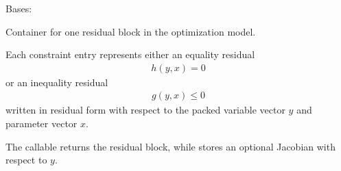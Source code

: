 \documentclass[letterpaper,10pt,english,openany,oneside]{sphinxmanual}
\begin{document}
\begin{fulllineitems}
\label{\detokenize{api/core/jaxmodel/constraints:jaxmodel.constraints.ConstraintEntry}}
\pysigstartsignatures
{}
\pysigstopsignatures
\sphinxAtStartPar
Bases: 

\sphinxAtStartPar
Container for one residual block in the optimization model.

\sphinxAtStartPar
Each constraint entry represents either an equality residual
\begin{equation*}
\begin{split}h(y, x) = 0\end{split}
\end{equation*}
\sphinxAtStartPar
or an inequality residual
\begin{equation*}
\begin{split}g(y, x) \le 0\end{split}
\end{equation*}
\sphinxAtStartPar
written in residual form with respect to the packed variable vector
\(y\) and parameter vector \(x\).

\sphinxAtStartPar
The  callable returns the residual block, while  stores
an optional Jacobian with respect to \(y\).


\end{fulllineitems}
\end{document}
